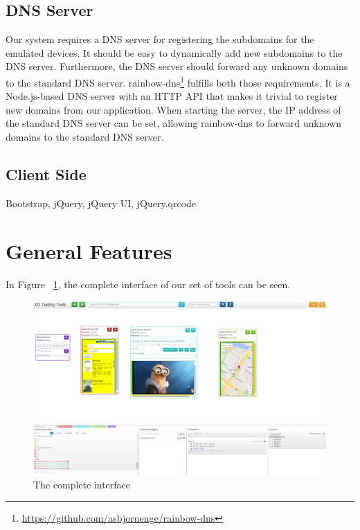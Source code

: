 \subsection{DNS Server}

Our system requires a DNS server for registering the subdomains for the emulated devices. It should be easy to dynamically add new subdomains to the DNS server. Furthermore, the DNS server should forward any unknown domains to the standard DNS server. rainbow-dns\footnote{\url{https://github.com/asbjornenge/rainbow-dns}} fulfills both those requirements. It is a Node.js-based DNS server with an HTTP API that makes it trivial to register new domains from our application. When starting the server, the IP address of the standard DNS server can be set, allowing rainbow-dns to forward unknown domains to the standard DNS server.

\subsection{Client Side}

Bootstrap, jQuery, jQuery UI, jQuery.qrcode

\section{General Features}

In Figure ~\ref{fig:complete}, the complete interface of our set of tools can be seen.

\begin{figure}[H]
  \centering
    \includegraphics[width=1.0\textwidth]{images/screenshots/complete.png}
	\caption{The complete interface}
	\label{fig:complete}
\end{figure}

